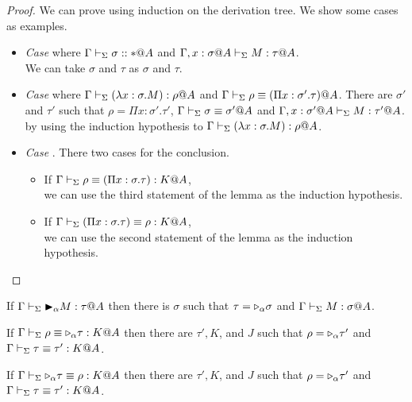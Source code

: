 \begin{proof}
	We can prove using induction on the derivation tree.
	We show some cases as examples.
				
	\begin{itemize}
		\item \textit{Case} \TAbs{} where $\Gamma\vdash_\Sigma \sigma::*@A$ and $\G,x:\sigma@A\V M:\tau@A$. \\
		      We can take $\sigma$ and $\tau$ as $\sigma$ and $\tau$. 
		      		      		      		      	      	      	      
		\item \textit{Case} \TConv{} where \(\G \V (\lambda x:\sigma.M) : \rho@A\) and \(\Gamma \vdash_\Sigma \rho \equiv (\Pi x:\sigma'.\tau)@A\).
		      There are $\sigma'$ and $\tau'$ such that
		      $\rho = \Pi x:\sigma'.\tau'$, $\Gamma \vdash_\Sigma \sigma \equiv \sigma'@A$ and $\Gamma ,x:\sigma'@A\vdash_\Sigma M:\tau'@A$.
		      by using the induction hypothesis to \(\G \V (\lambda x:\sigma.M) : \rho@A\).
		      	      	     		      	      	      	      
		\item \textit{Case} \QTRefl.
		      There two cases for the conclusion.
		      \begin{itemize}
		      	\item If $\Gamma \vdash_\Sigma \rho \equiv (\Pi x:\sigma.\tau) : K @A$,\\
		      	      we can use the third statement of the lemma as the induction hypothesis.
		      	\item If $\Gamma \vdash_\Sigma (\Pi x:\sigma.\tau) \equiv \rho : K @A$,\\
		      	      we can use the second statement of the lemma as the induction hypothesis.
		      \end{itemize}
	\end{itemize}
\end{proof}

\begin{lemma}
	\begin{item}
		  \item If $\G \V \TB_\alpha M : \tau@A$ then 
		  there is $\sigma$ such that $\tau = {\mathop{\triangleright}}_\alpha \sigma$ and $\G \V M : \sigma@A$.
	      \item If $\Gamma \vdash_\Sigma \rho \equiv {\mathop{\triangleright}}_\alpha \tau : K @A$ then there are $\tau', K$, and $J$ such that
	      $\rho = {\mathop{\triangleright}}_\alpha \tau'$ and $\Gamma \vdash_\Sigma \tau \equiv \tau' : K @A$.
	      \item If $\Gamma \vdash_\Sigma {\mathop{\triangleright}}_\alpha \tau \equiv \rho : K @A$ then there are $\tau', K$, and $J$ such that
	      $\rho = {\mathop{\triangleright}}_\alpha \tau'$ and $\Gamma \vdash_\Sigma \tau \equiv \tau' : K @A$.
	\end{item}
\end{lemma}

